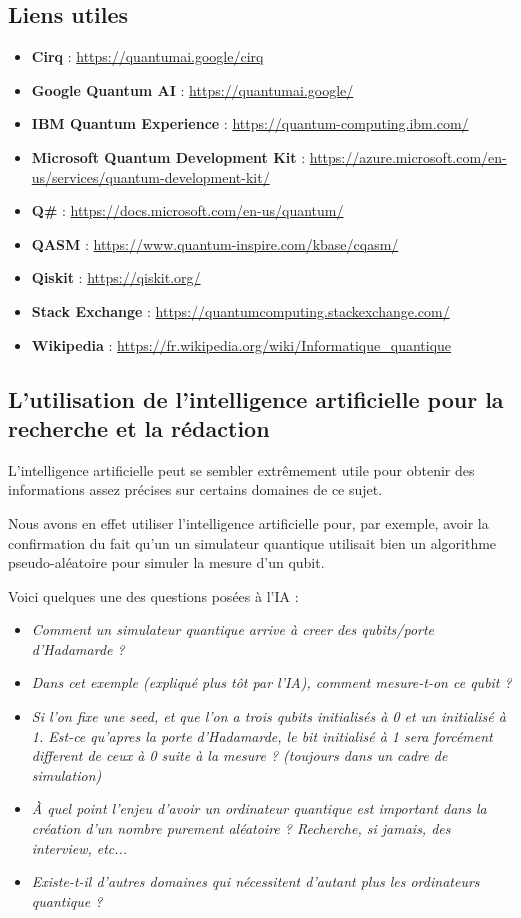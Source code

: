 \documentclass{article}
\begin{document}
\subsection{Liens utiles}
\begin{itemize}
  \item \textbf{Cirq} : \url{https://quantumai.google/cirq}
  \item \textbf{Google Quantum AI} : \url{https://quantumai.google/}
  \item \textbf{IBM Quantum Experience} : \url{https://quantum-computing.ibm.com/}
  \item \textbf{Microsoft Quantum Development Kit} : \url{https://azure.microsoft.com/en-us/services/quantum-development-kit/}
  \item \textbf{Q\#} : \url{https://docs.microsoft.com/en-us/quantum/}
  \item \textbf{QASM} : \url{https://www.quantum-inspire.com/kbase/cqasm/}
  \item \textbf{Qiskit} : \url{https://qiskit.org/}
  \item \textbf{Stack Exchange} : \url{https://quantumcomputing.stackexchange.com/}
  \item \textbf{Wikipedia} : \url{https://fr.wikipedia.org/wiki/Informatique_quantique}
\end{itemize}

\subsection{L'utilisation de l'intelligence artificielle pour la recherche et la rédaction}

L'intelligence artificielle peut se sembler extrêmement utile pour obtenir des informations assez précises sur certains domaines de ce sujet.

Nous avons en effet utiliser l'intelligence artificielle pour, par exemple, avoir la confirmation du fait qu'un un simulateur quantique utilisait bien un algorithme pseudo-aléatoire pour simuler la mesure d'un qubit.

Voici quelques une des questions posées à l'IA :

\begin{itemize}
  \item \textit{Comment un simulateur quantique arrive à creer des qubits/porte d'Hadamarde ?}
  \item \textit{Dans cet exemple (expliqué plus tôt par l'IA), comment mesure-t-on ce qubit ?}
  \item \textit{Si l'on fixe une seed, et que l'on a trois qubits initialisés à 0 et un initialisé à 1. Est-ce qu'apres la porte d'Hadamarde, le bit initialisé à 1 sera forcément different de ceux à 0 suite à la mesure ? (toujours dans un cadre de simulation) }
  \item \textit{À quel point l'enjeu d'avoir un ordinateur quantique est important dans la création d'un nombre purement aléatoire ? Recherche, si jamais, des interview, etc... }
  \item \textit{Existe-t-il d'autres domaines qui nécessitent d'autant plus les ordinateurs quantique ?}
\end{itemize}
\end{document}
